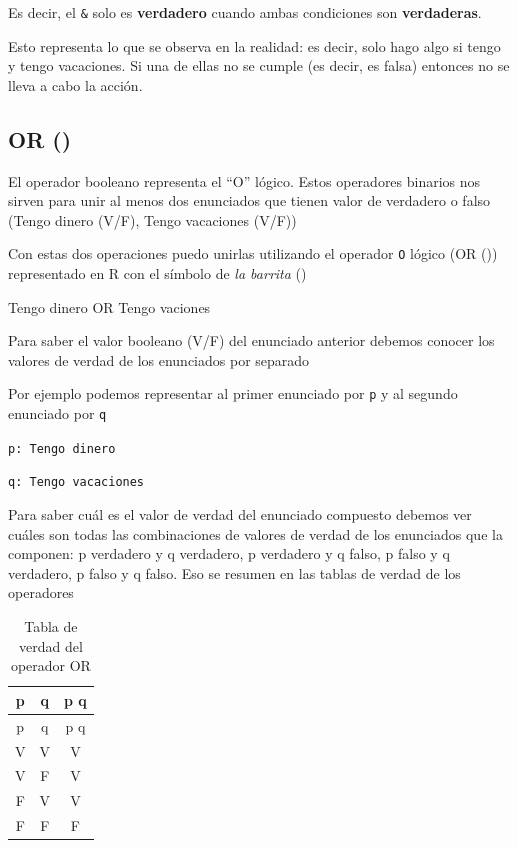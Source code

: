 \documentclass[
]{book}
\begin{document}
Es decir, el \texttt{\&} solo es \textbf{verdadero} cuando ambas condiciones son \textbf{verdaderas}.

Esto representa lo que se observa en la realidad: es decir, solo hago algo si tengo y tengo vacaciones. Si una de ellas no se cumple (es decir, es falsa) entonces no se lleva a cabo la acción.

\subsection{OR (\textbar)}\label{or}

El operador booleano \texttt{\textbar{}} representa el ``O'' lógico. Estos operadores binarios nos sirven para unir al menos dos enunciados que tienen valor de verdadero o falso (Tengo dinero (V/F), Tengo vacaciones (V/F))

Con estas dos operaciones puedo unirlas utilizando el operador \texttt{O} lógico (OR (\texttt{\textbar{}})) representado en R con el símbolo de \emph{la barrita} (\texttt{\textbar{}})

Tengo dinero OR Tengo vaciones

Para saber el valor booleano (V/F) del enunciado anterior debemos conocer los valores de verdad de los enunciados por separado

Por ejemplo podemos representar al primer enunciado por \texttt{p} y al segundo enunciado por \texttt{q}

\texttt{p:\ Tengo\ dinero}

\texttt{q:\ Tengo\ vacaciones}

Para saber cuál es el valor de verdad del enunciado compuesto debemos ver cuáles son todas las combinaciones de valores de verdad de los enunciados que la componen: p verdadero y q verdadero, p verdadero y q falso, p falso y q verdadero, p falso y q falso. Eso se resumen en las tablas de verdad de los operadores

\begin{longtable}[]{@{}ccc@{}}
\caption{Tabla de verdad del operador OR}\tabularnewline
\toprule\noalign{}
p & q & p \textbar{} q \\
\midrule\noalign{}
\endfirsthead
\toprule\noalign{}
p & q & p \textbar{} q \\
\midrule\noalign{}
\endhead
\bottomrule\noalign{}
\endlastfoot
V & V & V \\
V & F & V \\
F & V & V \\
F & F & F \\
\end{longtable}
\end{document}
